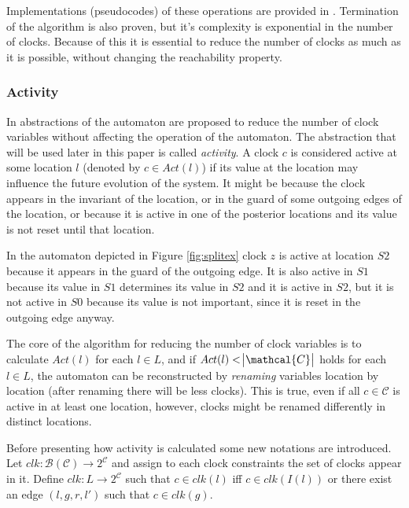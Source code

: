 Implementations (pseudocodes) of these operations are provided in \cite{bengtsson2004timed}. Termination of the algorithm is also proven, but it's complexity is exponential in the number of clocks. Because of this it is essential to reduce the number of clocks as much as it is possible, without changing the reachability property.

\subsubsection{Activity} \label{sec:acitivity}

In \cite{RSS96*73} abstractions of the automaton are proposed to reduce the number of clock variables without affecting the operation of the automaton. The abstraction that will be used later in this paper is called \emph{activity}. A clock $c$ is considered active  at some location $l$ (denoted by $c \in Act(l)$) if its value  at the location may influence the future evolution of the system. It might be because the clock appears in the invariant of the location, or in the guard of some outgoing edges of the location, or because it is active in one of the posterior locations and its value is not reset until that location.
\begin{example}
In the automaton depicted in Figure \ref{fig:splitex} clock $z$ is active at location $S2$ because it appears in the guard of the outgoing edge. It is also active in $S1$ because its value in $S1$ determines its value in $S2$ and it is active in $S2$, but it is not active in $S0$ because its value is not important, since it is reset in the outgoing edge anyway.
\end{example}
The core of the algorithm for reducing the number of clock variables is to calculate $Act(l)$ for each $l \in L$, and if $Act(l)<\abs{\mathcal{C}}$ holds for each $l \in L$, the automaton can be reconstructed by \emph{renaming} variables location by location (after renaming there will be less clocks). This is true, even if all $c \in \mathcal{C}$ is active in at least one location, however, clocks might be renamed differently in distinct locations.

Before presenting how activity is calculated some new notations are introduced. Let $clk: \mathcal{B}(\mathcal{C}) \to 2^\mathcal{C}$ and assign to each clock constraints the set of clocks appear in it. Define $clk:L \to  2^\mathcal{C}$ such that $c \in clk(l)$ iff $c \in clk(I(l))$ or there exist an edge $(l,g,r,l')$ such that $c \in clk(g)$.

